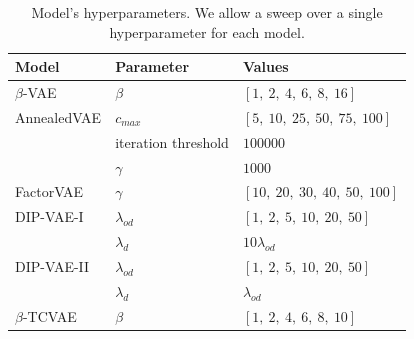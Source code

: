\begin{table}
\centering
\caption{Model's hyperparameters. We allow a sweep over a single hyperparameter for each model.}
\vspace{2mm}
\begin{tabular}{l l  l}
\toprule
\textbf{Model} & \textbf{Parameter} & \textbf{Values}\\
\midrule 
$\beta$-VAE & $\beta$ & $[1,\ 2,\ 4,\ 6,\ 8,\ 16]$\\
AnnealedVAE & $c_{max}$ & $[5,\ 10,\ 25,\ 50,\ 75,\ 100]$\\
& iteration threshold & $100000$\\
& $\gamma$ & $1000$\\
FactorVAE & $\gamma$ & $[10,\ 20,\ 30,\ 40,\ 50,\ 100]$\\
DIP-VAE-I & $\lambda_{od}$ & $[1,\ 2,\ 5,\ 10,\ 20,\ 50]$\\
&$\lambda_{d}$ & $10\lambda_{od}$\\
DIP-VAE-II & $\lambda_{od}$ & $[1,\ 2,\ 5,\ 10,\ 20,\ 50]$\\
&$\lambda_{d}$ & $\lambda_{od}$\\
$\beta$-TCVAE & $\beta$ & $[1,\ 2,\ 4,\ 6,\ 8,\ 10]$\\
\bottomrule
\end{tabular}
\label{table:sweep_main}
\end{table}

